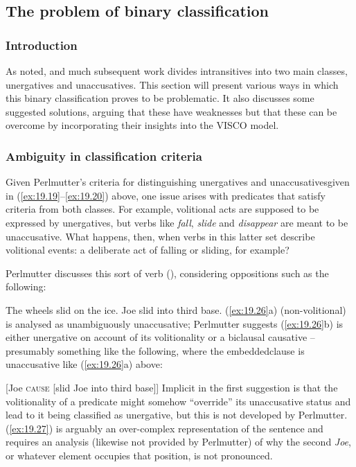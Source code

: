 \documentclass[output=paper]{langsci/langscibook}
\begin{document}
\subsection{The problem of binary classification}\label{sec:baker:3.4}

\subsubsection{Introduction}\label{sec:baker:3.4.1}

As noted, \citet{Perlmutter1978} and much subsequent work divides intransitives
into two main classes, unergatives and unaccusatives. This section will present
various ways in which this binary classification proves to be problematic. It
also discusses some suggested solutions, arguing that these have weaknesses but
that these can be overcome by incorporating their insights into the VISCO
model.

\subsubsection{Ambiguity in classification criteria}\label{sec:baker:3.4.2}

Given Perlmutter’s criteria for distinguishing unergatives and
unaccusatives\linebreak given in (\ref{ex:19.19}--\ref{ex:19.20}) above, one
issue arises with predicates that satisfy criteria from both classes. For
example, volitional acts are supposed to be expressed by unergatives, but verbs
like \emph{fall}, \emph{slide} and \emph{disappear} are meant to be
unaccusative. What happens, then, when verbs in this latter
set describe volitional events: a deliberate act of falling or sliding, for
example?

Perlmutter discusses this sort of verb (\citeyear[163--164]{Perlmutter1978}),
considering oppositions such as the following:

\ea\label{ex:19.26}
    \ea The wheels slid on the ice.
    \ex Joe slid into third base. \parencite[163--164]{Perlmutter1978}
    \z
\z
(\ref{ex:19.26}a) (non-volitional) is analysed as unambiguously unaccusative;
Perlmutter suggests (\ref{ex:19.26}b) is either unergative on
account of its volitionality or a biclausal causative – presumably something
like the following, where the embedded\linebreak clause is
unaccusative like (\ref{ex:19.26}a) above:

\ea\label{ex:19.27}
    [Joe \textsc{cause} [slid Joe into third base]]
\z
Implicit in the first suggestion is that the volitionality of a predicate might
somehow \enquote{override} its unaccusative status and lead
to it being classified as unergative, but this is not
developed by Perlmutter. (\ref{ex:19.27}) is arguably an over-complex
representation of the sentence and requires an analysis (likewise not provided
by Perlmutter) of why the second \emph{Joe}, or whatever element occupies that
position, is not pronounced.
\end{document}
